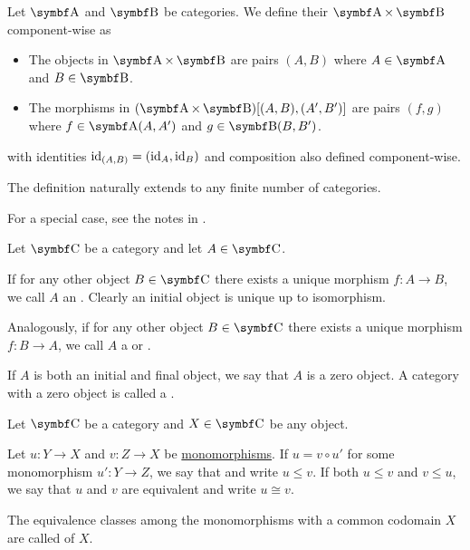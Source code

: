 \begin{definition}\label{def:product_category}
  Let \( \Cat{A} \) and \( \Bold B \) be categories. We define their  \( \Cat{A} \times \Bold B \) component-wise as
  \begin{itemize}
    \item The objects in \( \Cat{A} \times \Bold B \) are pairs \( (A, B) \) where \( A \in \Cat{A} \) and \( B \in \Bold B \).
    \item The morphisms in \( (\Cat{A} \times \Bold B)[(A, B), (A', B')] \) are pairs \( (f, g) \) where \( f \in \Cat{A}(A, A') \) and \( g \in \Bold{B}(B, B') \).
  \end{itemize}
  with identities \( \operatorname{id}_{(A,B)} =(\operatorname{id}_A, \operatorname{id}_B) \) and composition also defined component-wise.

  The definition naturally extends to any finite number of categories.

  For a special case, see the notes in .
\end{definition}

\begin{definition}\label{def:zero_objects}
  Let \( \Cat{C} \) be a category and let \( A \in \Cat{C} \).

  \begin{DefEnum}
     If for any other object \( B \in \Cat{C} \) there exists a unique morphism \( f: A \to B \), we call \( A \) an . Clearly an initial object is unique up to isomorphism.

     Analogously, if for any other object \( B \in \Cat{C} \) there exists a unique morphism \( f: B \to A \), we call \( A \) a  or .

     If \( A \) is both an initial and final object, we say that \( A \) is a zero object. A category with a zero object is called a .
  \end{DefEnum}
\end{definition}

\begin{definition}\label{def:categorical_subobject}
  Let \( \Cat{C} \) be a category and \( X \in \Cat{C} \) be any object.

  Let \( u: Y \to X \) and \( v: Z \to X \) be \hyperref[def:morphism_invertibility]{monomorphisms}. If \( u = v \circ u' \) for some monomorphism \( u': Y \to Z \), we say that  and write \( u \leq v \). If both \( u \leq v \) and \( v \leq u \), we say that \( u \) and \( v \) are equivalent and write \( u \cong v \).

  The equivalence classes among the monomorphisms with a common codomain \( X \) are called  of \( X \).
\end{definition}
